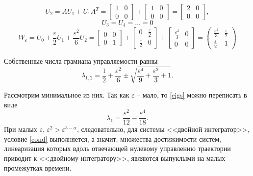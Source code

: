 \documentclass[../main.tex]{subfiles}
\begin{document}
\begin{equation*}
	U_2 = A U_1 + U_1 A^T = \left[ {\begin{array}{*{20}{c}}
			1&0\\
			0&0
	\end{array}}\right] + \left[ {\begin{array}{*{20}{c}}
			1&0\\
			0&0
	\end{array}}\right] = \left[ {\begin{array}{*{20}{c}}
			2&0\\
			0&0
	\end{array}}\right],
\end{equation*}
\begin{equation*}
	U_3 = U_4 = \dots = 0
\end{equation*}
\begin{equation*}
	W_{\varepsilon} = U_0 + \dfrac{\varepsilon}{2} U_1 + \dfrac{\varepsilon^2}{6} U_2 = \left[ {\begin{array}{*{20}{c}}
			0&0\\
			0&1
	\end{array}}\right] + \left[ {\begin{array}{*{20}{c}}
			0&\frac{\varepsilon}{2}\\
			\frac{\varepsilon}{2}&0
	\end{array}}\right] +\left[ {\begin{array}{*{20}{c}}
			\frac{\varepsilon^2}{3}&0\\
			0&0
	\end{array}}\right] =  
	\begin{pmatrix}
		\frac{\varepsilon^2}{3}&\frac{\varepsilon}{2}\\
		\frac{\varepsilon}{2}&1
	\end{pmatrix} 
\end{equation*}

Собственные числа грамиана управляемости равны
\begin{equation}\label{eigs}
	\lambda_{1,2} = \dfrac{1}{2}+\dfrac{\varepsilon^2}{6} \pm \sqrt{\dfrac{\varepsilon^4}{9} + \dfrac{\varepsilon^2}{3} +1}.
\end{equation}

Рассмотрим минимальное из них. Так как $ \varepsilon $ -- мало, то \eqref{eigs} можно переписать в виде
\begin{equation*}
	\lambda_1 = \dfrac{\varepsilon^2}{12} - \dfrac{\varepsilon^4}{18}.
\end{equation*} 
При малых $ \varepsilon  $, $ \varepsilon^2 >  \varepsilon^{3-\alpha}  $, следовательно,  для системы <<двойной интегратор>>, условие \eqref{cond} выполняется, а значит, множества достижимости систем, линеаризация которых вдоль отвечающей нулевому управлению траектории приводит к <<двойному интегратору>>, являются выпуклыми на малых промежутках времени.
\end{document}
